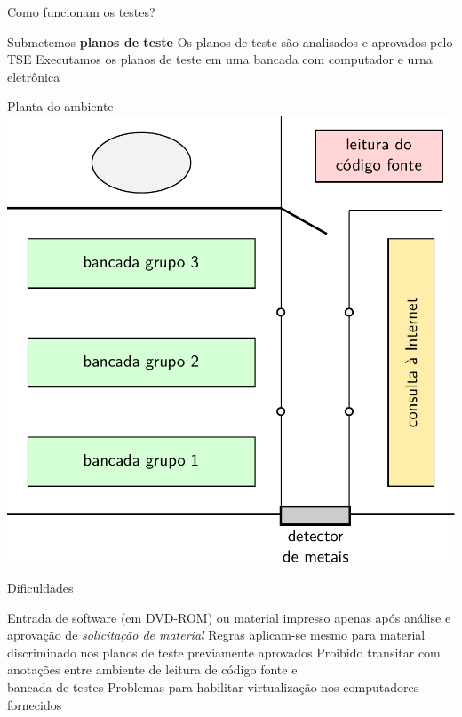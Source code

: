 \documentclass[14pt]{beamer}
\begin{document}
\begin{frame}{Como funcionam os testes?}
  \begin{fullpageitemize}
    \itemR Submetemos \textbf{planos de teste}
    \itemR Os planos de teste são analisados e aprovados pelo TSE
    \itemR Executamos os planos de teste em uma bancada com computador e urna eletrônica
  \end{fullpageitemize}
\end{frame}

\begin{frame}{Planta do ambiente}
  \centering
  \includegraphics[width=\textwidth,height=0.90\textheight,keepaspectratio]{images/planta}
\end{frame}

\begin{frame}{Dificuldades}
  \begin{fullpageitemize}
    \itemR Entrada de software (em DVD-ROM) ou material impresso apenas após análise e aprovação de \textit{solicitação de material}
    \itemR Regras aplicam-se mesmo para material discriminado nos planos de teste previamente aprovados
    \itemR Proibido transitar com anotações entre ambiente de leitura de código fonte e\\ bancada de testes
    \itemR Problemas para habilitar virtualização nos computadores fornecidos
  \end{fullpageitemize}
\end{frame}
\end{document}
